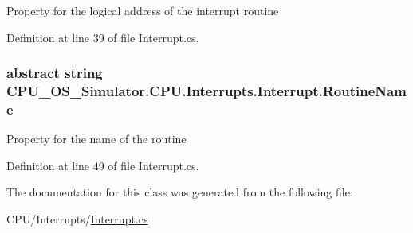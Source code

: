 Property for the logical address of the interrupt routine 



Definition at line 39 of file Interrupt.\+cs.

\hypertarget{class_c_p_u___o_s___simulator_1_1_c_p_u_1_1_interrupts_1_1_interrupt_a71517440db47453739db9398108b5b74}{}
\subsubsection[{Routine\+Name}]{\setlength{\rightskip}{0pt plus 5cm}abstract string C\+P\+U\+\_\+\+O\+S\+\_\+\+Simulator.\+C\+P\+U.\+Interrupts.\+Interrupt.\+Routine\+Name\hspace{0.3cm}{\ttfamily [get]}}\label{class_c_p_u___o_s___simulator_1_1_c_p_u_1_1_interrupts_1_1_interrupt_a71517440db47453739db9398108b5b74}


Property for the name of the routine 



Definition at line 49 of file Interrupt.\+cs.



The documentation for this class was generated from the following file\+:\begin{DoxyCompactItemize}
\item 
C\+P\+U/\+Interrupts/\hyperlink{_interrupt_8cs}{Interrupt.\+cs}\end{DoxyCompactItemize}
